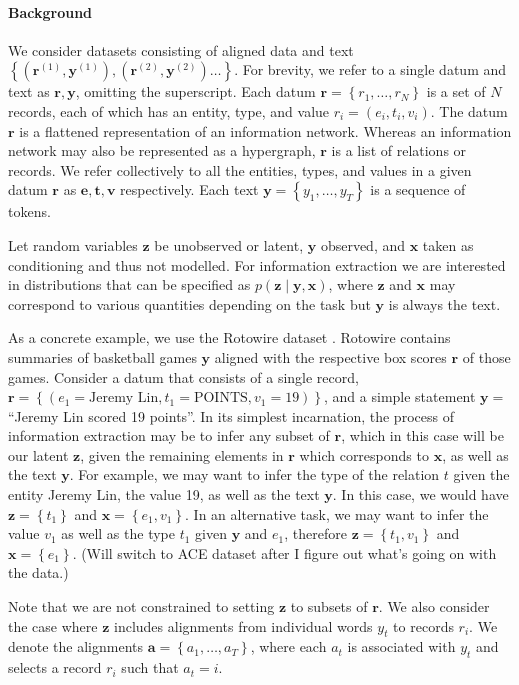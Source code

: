 \documentclass[11pt]{article}
\newcommand\set[1]{\left\{#1\right\}}
\newcommand{\ba}{\mathbf{a}}
\newcommand{\be}{\mathbf{e}}
\newcommand{\br}{\mathbf{r}}
\newcommand{\bt}{\mathbf{t}}
\newcommand{\bv}{\mathbf{v}}
\newcommand{\bx}{\mathbf{x}}
\newcommand{\by}{\mathbf{y}}
\newcommand{\bz}{\mathbf{z}}
\begin{document}
\paragraph{Background}
We consider datasets consisting of aligned data and text
$\set{(\br^{(1)}, \by^{(1)}),(\br^{(2)},\by^{(2)})\ldots}$.
For brevity, we refer to a single datum and text as $\br,\by$, omitting the superscript.
Each datum $\br = \set{r_1,\ldots,r_N}$ is a set of $N$ records, each of which has
an entity, type, and value $r_i = (e_i, t_i, v_i)$.
The datum $\br$ is a flattened representation of an information network.
Whereas an information network may also be represented as a hypergraph,
$\br$ is a list of relations or records.
We refer collectively to all the entities, types, and values in a given datum $\br$ as
$\be,\bt,\bv$ respectively.
Each text $\by = \set{y_1,\ldots,y_T}$ is a sequence of tokens.

Let random variables $\bz$ be unobserved or latent, $\by$ observed, and $\bx$ taken as conditioning
and thus not modelled.
For information extraction we are interested in distributions that can be specified as $p(\bz\mid\by,\bx)$,
where $\bz$ and $\bx$ may correspond to various quantities depending on the task
but $\by$ is always the text.

As a concrete example, we use the Rotowire dataset \citep{wiseman2017d2t}.
Rotowire contains summaries of basketball games $\by$ aligned with the respective
box scores $\br$ of those games.
Consider a datum that consists of a single record,
$\br = \set{(e_1 = \textrm{Jeremy Lin}, t_1 = \textrm{POINTS}, v_1 = 19)}$,
and a simple statement $\by = $``Jeremy Lin scored 19 points''.
In its simplest incarnation, the process of information extraction may be to infer any
subset of $\br$, which in this case will be our latent $\bz$, given the remaining elements in $\br$
which corresponds to $\bx$, as well as the text $\by$.
For example, we may want to infer the type of the relation $t$ given 
the entity Jeremy Lin, the value 19, as well as the text $\by$.
In this case, we would have $\bz = \set{t_1}$ and $\bx = \set{e_1,v_1}$.
In an alternative task, we may want to infer the value $v_1$ 
as well as the type $t_1$ given $\by$ and $e_1$, therefore $\bz = \set{t_1,v_1}$ and $\bx=\set{e_1}$.
(Will switch to ACE dataset after I figure out what's going on with the data.)

Note that we are not constrained to setting $\bz$ to subsets of $\br$.
We also consider the case where $\bz$ includes alignments from individual words $y_t$
to records $r_i$. We denote the alignments $\ba = \set{a_1,\ldots,a_T}$,
where each $a_t$ is associated with $y_t$ and selects a record $r_i$ such that $a_t = i$.
\end{document}
